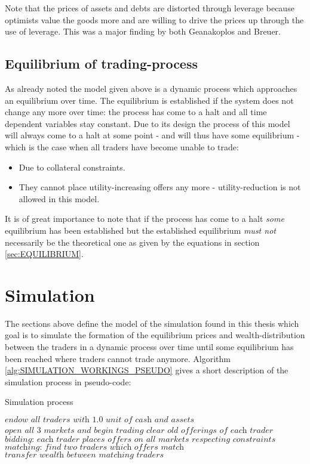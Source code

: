 \documentclass[../Bachelorarbeit.tex]{subfiles}
\begin{document}
\medskip

Note that the prices of assets and debts are distorted through leverage because optimists value the goods more and are willing to drive the prices up through the use of leverage. This was a major finding by both Geanakoplos and Breuer.

\subsection{Equilibrium of trading-process}
\label{sec:LEVERAGE_CYCLE_EQUILIBRIUM_TRADINGPROCESS}
As already noted the model given above is a dynamic process which approaches an equilibrium over time. The equilibrium is established if the system does not change any more over time: the process has come to a halt and all time dependent variables stay constant. Due to its design the process of this model will always come to a halt at some point - and will thus have some equilibrium - which is the case when all traders have become unable to trade:

\begin{itemize}
\item Due to collateral constraints.
\item They cannot place utility-increasing offers any more - utility-reduction is not allowed in this model.
\end{itemize}

It is of great importance to note that if the process has come to a halt \textit{some} equilibrium has been established but the established equilibrium \textit{must not} necessarily be the theoretical one as given by the equations in section \ref{sec:EQUILIBRIUM}.

\section{Simulation}
\label{sec:LEVERAGE_CYCLE_SIMULATION}
The sections above define the model of the simulation found in this thesis which goal is to simulate the formation of the equilibrium prices and wealth-distribution between the traders in a dynamic process over time until some equilibrium has been reached where traders cannot trade anymore. Algorithm \ref{alg:SIMULATION_WORKINGS_PSEUDO} gives a short description of the simulation process in pseudo-code:

\begin{algorithm}
\caption{Simulation process}
\label{alg:SIMULATION_WORKINGS_PSEUDO}
\begin{algorithmic}[1]
\State $\textit{endow all traders with 1.0 unit of cash and assets}$
\State $\textit{open all 3 markets and begin trading}$
	\State $\textit{clear old offerings of each trader}$
	\State $\textit{bidding: each trader places offers on all markets respecting constraints}$
	\State $\textit{matching: find two traders which offers match}$
		\State $\textit{transfer wealth between matching traders}$
	\EndIf
\EndWhile
\end{algorithmic}
\end{algorithm}
\end{document}

